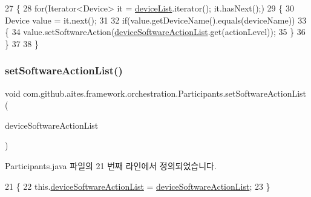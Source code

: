 \begin{DoxyCode}
27                                                                         \{
28         \textcolor{keywordflow}{for}(Iterator<Device> it = \mbox{\hyperlink{classcom_1_1github_1_1aites_1_1framework_1_1orchestration_1_1_participants_ab90ca1b5cf16aec6e3e6608df4a8d2ad}{deviceList}}.iterator(); it.hasNext();)
29         \{
30             Device value = it.next();
31             
32             \textcolor{keywordflow}{if}(value.getDeviceName().equals(deviceName))
33             \{
34                 value.setSoftwareAction(\mbox{\hyperlink{classcom_1_1github_1_1aites_1_1framework_1_1orchestration_1_1_participants_ac53ce12002e42b5ed3b6ff38afbbaf01}{deviceSoftwareActionList}}.get(actionLevel));
35             \}
36         \}
37         
38     \}
\end{DoxyCode}
\mbox{\label{classcom_1_1github_1_1aites_1_1framework_1_1orchestration_1_1_participants_aa5c13f562d712ebaa0ff363f650731ae}} 
\subsubsection{\texorpdfstring{set\+Software\+Action\+List()}{setSoftwareActionList()}}
{\footnotesize\ttfamily void com.\+github.\+aites.\+framework.\+orchestration.\+Participants.\+set\+Software\+Action\+List (\begin{DoxyParamCaption}\item[{Array\+List$<$ String $>$}]{device\+Software\+Action\+List }\end{DoxyParamCaption})}



Participants.\+java 파일의 21 번째 라인에서 정의되었습니다.


\begin{DoxyCode}
21                                                                                  \{
22         this.\mbox{\hyperlink{classcom_1_1github_1_1aites_1_1framework_1_1orchestration_1_1_participants_ac53ce12002e42b5ed3b6ff38afbbaf01}{deviceSoftwareActionList}} = 
      \mbox{\hyperlink{classcom_1_1github_1_1aites_1_1framework_1_1orchestration_1_1_participants_ac53ce12002e42b5ed3b6ff38afbbaf01}{deviceSoftwareActionList}};
23     \}
\end{DoxyCode}


